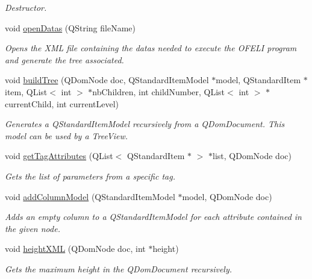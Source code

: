 \begin{DoxyCompactItemize}
\begin{DoxyCompactList}\small\item\em Destructor. \end{DoxyCompactList}\item 
void \hyperlink{classMainWindow_a39b737ba3023be40c3c8c03a264934b2}{open\-Datas} (Q\-String file\-Name)
\begin{DoxyCompactList}\small\item\em Opens the X\-M\-L file containing the datas needed to execute the O\-F\-E\-L\-I program and generate the tree associated. \end{DoxyCompactList}\item 
void \hyperlink{classMainWindow_acdc6db8778f0183a241c92dae9f138f0}{build\-Tree} (Q\-Dom\-Node doc, Q\-Standard\-Item\-Model $\ast$model, Q\-Standard\-Item $\ast$item, Q\-List$<$ int $>$ $\ast$nb\-Children, int child\-Number, Q\-List$<$ int $>$ $\ast$current\-Child, int current\-Level)
\begin{DoxyCompactList}\small\item\em Generates a Q\-Standard\-Item\-Model recursively from a Q\-Dom\-Document. This model can be used by a Tree\-View. \end{DoxyCompactList}\item 
void \hyperlink{classMainWindow_af90fffcac39eb4bc42810588408111c3}{get\-Tag\-Attributes} (Q\-List$<$ Q\-Standard\-Item $\ast$ $>$ $\ast$list, Q\-Dom\-Node doc)
\begin{DoxyCompactList}\small\item\em Gets the list of parameters from a specific tag. \end{DoxyCompactList}\item 
void \hyperlink{classMainWindow_a6ac713dd9f9fcee2b6d285bb0ae5d3d1}{add\-Column\-Model} (Q\-Standard\-Item\-Model $\ast$model, Q\-Dom\-Node doc)
\begin{DoxyCompactList}\small\item\em Adds an empty column to a Q\-Standard\-Item\-Model for each attribute contained in the given node. \end{DoxyCompactList}\item 
void \hyperlink{classMainWindow_ac886ea69c593b8906039e86a91697705}{height\-X\-M\-L} (Q\-Dom\-Node doc, int $\ast$height)
\begin{DoxyCompactList}\small\item\em Gets the maximum height in the Q\-Dom\-Document recursively. \end{DoxyCompactList}\item 

\end{DoxyCompactItemize}
